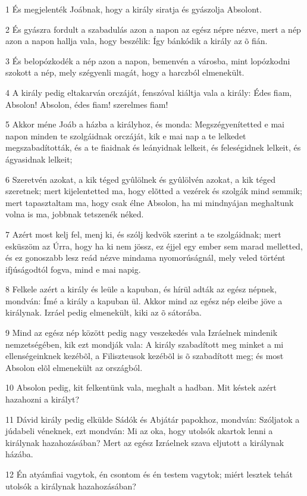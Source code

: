 \par 1 És megjelenték Joábnak, hogy a király siratja és gyászolja Absolont.
\par 2 És gyászra fordult a szabadulás azon a napon az egész népre nézve, mert a nép azon a napon hallja vala, hogy beszélik: Így bánkódik a király az õ fián.
\par 3 És belopózkodék a nép azon a napon, bemenvén a városba, mint lopózkodni szokott a nép, mely szégyenli magát, hogy a harczból elmenekült.
\par 4 A király pedig eltakarván orczáját, fenszóval kiáltja vala a király: Édes fiam, Absolon! Absolon, édes fiam! szerelmes fiam!
\par 5 Akkor méne Joáb a házba a királyhoz, és monda: Megszégyenítetted e mai napon minden te szolgáidnak orczáját, kik e mai nap a te lelkedet megszabadították, és a te fiaidnak és leányidnak lelkeit, és feleségidnek lelkeit, és ágyasidnak lelkeit;
\par 6 Szeretvén azokat, a kik téged gyûlölnek és gyûlölvén azokat, a kik téged szeretnek; mert kijelentetted ma, hogy elõtted a vezérek és szolgák mind semmik; mert tapasztaltam ma, hogy csak élne Absolon, ha mi mindnyájan meghaltunk volna is ma, jobbnak tetszenék néked.
\par 7 Azért most kelj fel, menj ki, és szólj kedvök szerint a te szolgáidnak; mert esküszöm az Úrra, hogy ha ki nem jössz, ez éjjel egy ember sem marad melletted, és ez gonoszabb lesz reád nézve mindama nyomorúságnál, mely veled történt ifjúságodtól fogva, mind e mai napig.
\par 8 Felkele azért a király és leüle a kapuban, és hírül adták az egész népnek, mondván: Ímé a király a kapuban ül. Akkor mind az egész nép eleibe jöve a királynak. Izráel pedig elmenekült, kiki az õ sátorába.
\par 9 Mind az egész nép között pedig nagy veszekedés vala Izráelnek mindenik nemzetségében, kik ezt mondják vala: A király szabadított meg minket a mi ellenségeinknek kezébõl, a Filiszteusok kezébõl is õ szabadított meg; és most Absolon elõl elmenekült az országból.
\par 10 Absolon pedig, kit felkentünk vala, meghalt a hadban. Mit késtek azért hazahozni a királyt?
\par 11 Dávid király pedig elkülde Sádók és Abjátár papokhoz, mondván: Szóljatok a júdabeli véneknek, ezt mondván: Mi az oka, hogy utolsók akartok lenni a királynak hazahozásában? Mert az egész Izráelnek  szava eljutott a királynak házába.
\par 12 Én atyámfiai vagytok, én csontom és én testem vagytok; miért lesztek tehát utolsók a királynak hazahozásában?
